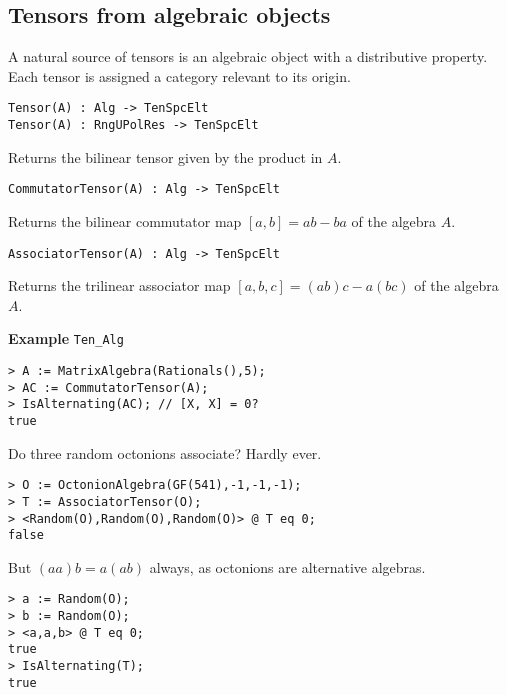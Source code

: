 \subsection{Tensors from algebraic objects}
A natural source of tensors is an algebraic object with a distributive 
property.
Each tensor is assigned a category relevant to its origin. 


\color{blue}
{\small \begin{verbatim}
Tensor(A) : Alg -> TenSpcElt
Tensor(A) : RngUPolRes -> TenSpcElt
\end{verbatim} }
\color{black}

Returns the bilinear tensor given by the product in $A$.

\color{blue}
{\small \begin{verbatim}
CommutatorTensor(A) : Alg -> TenSpcElt
\end{verbatim} }
\color{black}

Returns the bilinear commutator map $[a,b]=ab-ba$ of the algebra $A$.

\color{blue}
{\small \begin{verbatim}
AssociatorTensor(A) : Alg -> TenSpcElt
\end{verbatim} }
\color{black}

Returns the trilinear associator map $[a,b,c]=(ab)c-a(bc)$ of the algebra $A$.

\medskip
\begin{framed} {\bf Example} {\tt Ten\_Alg}\\
{\small
\begin{lstlisting}[frame=single,basicstyle=\ttfamily\color{black!30!
teal},backgroundcolor=\color{white!70!gray}]
> A := MatrixAlgebra(Rationals(),5);
> AC := CommutatorTensor(A);
> IsAlternating(AC); // [X, X] = 0?
true
\end{lstlisting}
Do three random octonions associate? Hardly ever.
\begin{lstlisting}[frame=single,basicstyle=\ttfamily\color{black!30!
teal},backgroundcolor=\color{white!70!gray}]
> O := OctonionAlgebra(GF(541),-1,-1,-1);
> T := AssociatorTensor(O);
> <Random(O),Random(O),Random(O)> @ T eq 0;
false
\end{lstlisting}
But $(aa)b=a(ab)$ always, as octonions are alternative algebras.
\begin{lstlisting}[frame=single,basicstyle=\ttfamily\color{black!30!
teal},backgroundcolor=\color{white!70!gray}]
> a := Random(O); 
> b := Random(O); 
> <a,a,b> @ T eq 0;
true
> IsAlternating(T);
true
\end{lstlisting}
}
\end{framed}


